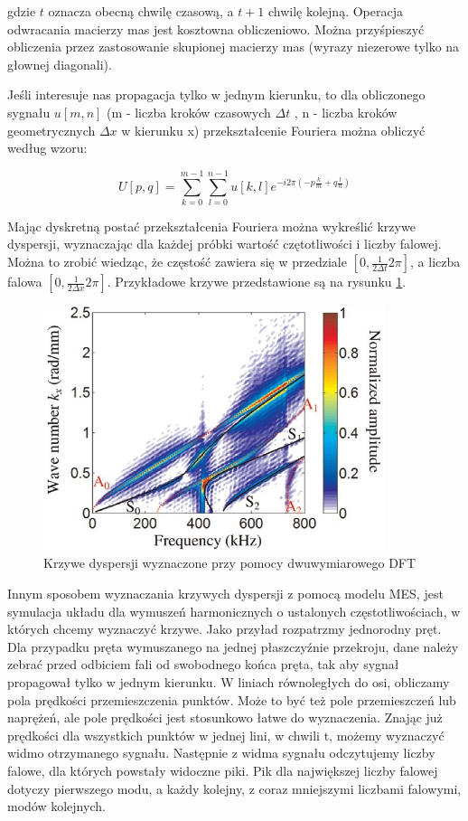 gdzie \( t \) oznacza obecną chwilę czasową, a \( t+1 \) chwilę kolejną.
Operacja odwracania macierzy mas jest kosztowna obliczeniowo. Można przyśpieszyć obliczenia przez zastosowanie skupionej macierzy mas (wyrazy niezerowe tylko na głownej diagonali).

Jeśli interesuje nas propagacja tylko w jednym kierunku, to dla obliczonego sygnału \( u[m, n] \) (m - liczba kroków czasowych \(\Delta t \) , n - liczba kroków geometrycznych \(\Delta x\) w kierunku x) przekształcenie Fouriera można obliczyć według wzoru:

\begin{equation} \label{eq:fourier_2d}
U[p, q] = \sum_{k=0}^{m-1} \sum_{l=0}^{n-1} u[k, l]e^{-i2\pi (-p \frac{k}{m} + q\frac{l}{n})}
\end{equation}

Mając dyskretną postać przekształcenia Fouriera można wykreślić krzywe dyspersji, wyznaczając dla każdej próbki wartość czętotliwości i liczby falowej. Można to zrobić wiedząc, że częstość zawiera się w przedziale \([0, \frac{1}{2\Delta t}2\pi]\), a liczba falowa \([0, \frac{1}{2\Delta x}2\pi]\). Przykładowe krzywe przedstawione są na rysunku \ref{fig:krzywe_dyspersji_tian1}.

\vspace{5mm}

\begin{figure}[h]
\centering
\includegraphics[width=10cm]{Zdjecia/2/dyspersja_tian1}
\caption{Krzywe dyspersji wyznaczone przy pomocy dwuwymiarowego DFT \cite{bartek_tian}}
\label{fig:krzywe_dyspersji_tian1}
\end{figure}

Innym sposobem wyznaczania krzywych dyspersji z pomocą modelu MES, jest symulacja układu dla wymuszeń harmonicznych o ustalonych częstotliwościach, w których chcemy wyznaczyć krzywe. Jako przyład rozpatrzmy jednorodny pręt. Dla przypadku pręta wymuszanego na jednej płaszczyźnie przekroju, dane należy zebrać przed odbiciem fali od swobodnego końca pręta, tak aby sygnał propagował tylko w jednym kierunku. W liniach równoległych do osi, obliczamy pola prędkości przemieszczenia punktów. Może to być też pole przemieszczeń lub naprężeń, ale pole prędkości jest stosunkowo łatwe do wyznaczenia.
Znając już prędkości dla wszystkich punktów w jednej lini, w chwili t, możemy wyznaczyć widmo otrzymanego sygnału. Następnie z widma sygnału odczytujemy liczby falowe, dla których powstały widoczne piki. Pik dla największej liczby falowej dotyczy pierwszego modu, a każdy kolejny, z coraz mniejszymi liczbami falowymi, modów kolejnych.

